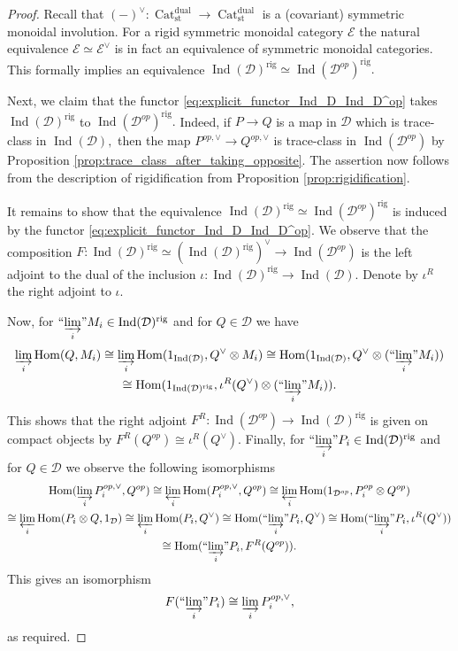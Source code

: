 \documentclass[11pt,leqno]{amsart}
\numberwithin{equation}{section}
\def\Hom{\operatorname{Hom}}
\newcommand{\indlim}[1][]{\mathop{\varinjlim}\limits_{#1}}
\newcommand{\inddlim}[1][]{{``{\indlim[#1]}"}}
\newcommand{\prolim}[1][]{\mathop{\varprojlim}\limits_{#1}}
\newcommand{\rig}{\operatorname{rig}}
\newcommand{\Cat}{\operatorname{Cat}}
\newcommand{\st}{\operatorname{st}}
\newcommand{\dual}{\operatorname{dual}}
\newcommand{\cD}{{\mathcal D}}
\newcommand{\cE}{{\mathcal E}}
\newcommand{\Ind}{\operatorname{Ind}}
\begin{document}
\begin{proof}
Recall that $(-)^{\vee}:\Cat_{\st}^{\dual}\to \Cat_{\st}^{\dual}$ is a (covariant) symmetric monoidal involution. For a rigid symmetric monoidal category $\cE$ the natural equivalence $\cE\simeq\cE^{\vee}$ is in fact an equivalence of symmetric monoidal categories. This formally implies an equivalence $\Ind(\cD)^{\rig}\simeq \Ind(\cD^{op})^{\rig}.$

Next, we claim that the functor \eqref{eq:explicit_functor_Ind_D_Ind_D^op} takes $\Ind(\cD)^{\rig}$ to $\Ind(\cD^{op})^{\rig}.$ Indeed, if $P\to Q$ is a map in $\cD$ which is trace-class in $\Ind(\cD),$ then the map $P^{op,\vee}\to Q^{op,\vee}$ is trace-class in $\Ind(\cD^{op})$ by Proposition \ref{prop:trace_class_after_taking_opposite}. The assertion now follows from the description of rigidification from Proposition \ref{prop:rigidification}.  
	
It remains to show that the equivalence $\Ind(\cD)^{\rig}\simeq \Ind(\cD^{op})^{\rig}$ is induced by the functor \eqref{eq:explicit_functor_Ind_D_Ind_D^op}. We observe that the composition $F:\Ind(\cD)^{\rig}\simeq (\Ind(\cD)^{\rig})^{\vee}\to \Ind(\cD^{op})$ is the left adjoint to the dual of the inclusion $\iota:\Ind(\cD)^{\rig}\to \Ind(\cD).$ Denote by $\iota^R$ the right adjoint to $\iota.$ 
	
Now, for $\inddlim[i]M_i\in\Ind(\cD)^{\rig}$ and for $Q\in\cD$ we have
\begin{multline*}
\indlim[i]\Hom(Q,M_i)\cong \indlim[i]\Hom(1_{\Ind(\cD)},Q^{\vee}\otimes M_i)\cong \Hom(1_{\Ind(\cD)},Q^{\vee}\otimes (\inddlim[i]M_i))\\
\cong \Hom(1_{\Ind(\cD)^{\rig}},\iota^R(Q^{\vee})\otimes (\inddlim[i]M_i)).
\end{multline*}
This shows that the right adjoint $F^R:\Ind(\cD^{op})\to \Ind(\cD)^{\rig}$ is given on compact objects by $F^R(Q^{op})\cong \iota^R(Q^{\vee}).$ Finally, for $\inddlim[i]P_i\in\Ind(\cD)^{\rig}$ and for $Q\in\cD$ we observe the following isomorphisms
\begin{multline*}
\Hom(\indlim[i]P_i^{op,\vee},Q^{op})\cong \prolim[i]\Hom(P_i^{op,\vee},Q^{op})\cong\prolim[i]\Hom(1_{\cD^{op}},P_i^{op}\otimes Q^{op})\\
\cong \prolim[i]\Hom(P_i\otimes Q,1_{\cD})\cong \prolim[i]\Hom(P_i,Q^{\vee})\cong \Hom(\inddlim[i]P_i,Q^{\vee})\cong \Hom(\inddlim[i]P_i,\iota^R(Q^{\vee}))\\
\cong \Hom(\inddlim[i]P_i,F^R(Q^{op})).
\end{multline*}
This gives an isomorphism
\begin{equation*}
F(\inddlim[i]P_i)\cong\indlim[i] P_i^{op,\vee},
\end{equation*}
as required.
\end{proof}
\end{document}
